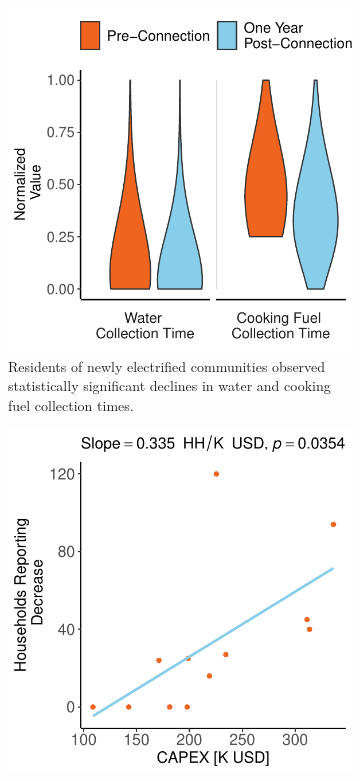 \begin{figure}[t]
    \centering
    \begin{subfigure}[t]{0.48\textwidth}
        \centering
        \includegraphics[width=\textwidth]{images/gender_equality_paired_results.pdf}
        \caption{Residents of newly electrified communities observed statistically significant declines in water and cooking fuel collection times.}
        \label{fig:gender_equality_paired_results}
    \end{subfigure}
    \hfill
    \begin{subfigure}[t]{0.48\textwidth}
        \centering
        \includegraphics[width=\textwidth]{images/water_collection_time_regression_community.pdf}

\end{subfigure}
\end{figure}
